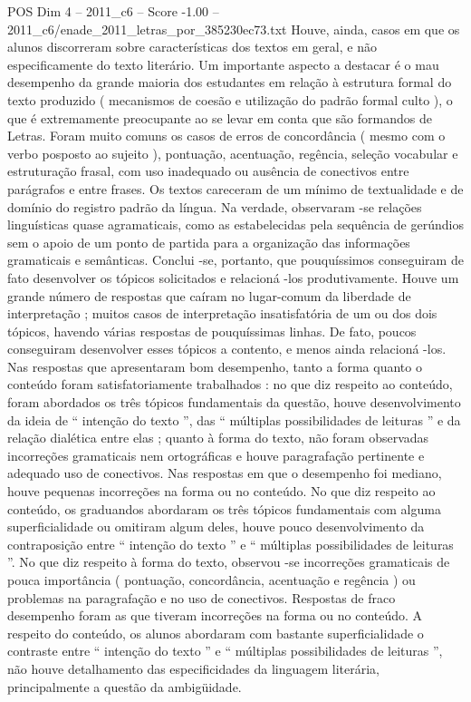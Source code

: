 \begin{textsample}{POS Dim 4 – 2011\_c6 – Score -1.00 – 2011\_c6/enade\_2011\_letras\_por\_385230ec73.txt}
Houve, ainda, casos em que os alunos discorreram sobre características dos textos em geral, e não especificamente do texto literário.
Um importante aspecto a destacar é o mau desempenho da grande maioria dos estudantes em relação à estrutura formal do texto produzido ( mecanismos de coesão e utilização do padrão formal culto ), o que é extremamente preocupante ao se levar em conta que são formandos de Letras.
Foram muito comuns os casos de erros de concordância ( mesmo com o verbo posposto ao sujeito ), pontuação, acentuação, regência, seleção vocabular e estruturação frasal, com uso inadequado ou ausência de conectivos entre parágrafos e entre frases.
Os textos careceram de um mínimo de textualidade e de domínio do registro padrão da língua.
Na verdade, observaram -se relações linguísticas quase agramaticais, como as estabelecidas pela sequência de gerúndios sem o apoio de um ponto de partida para a organização das informações gramaticais e semânticas.
Conclui -se, portanto, que pouquíssimos conseguiram de fato desenvolver os tópicos solicitados e relacioná -los produtivamente.
Houve um grande número de respostas que caíram no lugar-comum da liberdade de interpretação ; muitos casos de interpretação insatisfatória de um ou dos dois tópicos, havendo várias respostas de pouquíssimas linhas.
De fato, poucos conseguiram desenvolver esses tópicos a contento, e menos ainda relacioná -los.
Nas respostas que apresentaram bom desempenho, tanto a forma quanto o conteúdo foram satisfatoriamente trabalhados : no que diz respeito ao conteúdo, foram abordados os três tópicos fundamentais da questão, houve desenvolvimento da ideia de “ intenção do texto ”, das “ múltiplas possibilidades de leituras ” e da relação dialética entre elas ; quanto à forma do texto, não foram observadas incorreções gramaticais nem ortográficas e houve paragrafação pertinente e adequado uso de conectivos.
Nas respostas em que o desempenho foi mediano, houve pequenas incorreções na forma ou no conteúdo.
No que diz respeito ao conteúdo, os graduandos abordaram os três tópicos fundamentais com alguma superficialidade ou omitiram algum deles, houve pouco desenvolvimento da contraposição entre “ intenção do texto ” e “ múltiplas possibilidades de leituras ”.
No que diz respeito à forma do texto, observou -se incorreções gramaticais de pouca importância ( pontuação, concordância, acentuação e regência ) ou problemas na paragrafação e no uso de conectivos.
Respostas de fraco desempenho foram as que tiveram incorreções na forma ou no conteúdo.
A respeito do conteúdo, os alunos abordaram com bastante superficialidade o contraste entre “ intenção do texto ” e “ múltiplas possibilidades de leituras ”, não houve detalhamento das especificidades da linguagem literária, principalmente a questão da ambigüidade.

\end{textsample}
